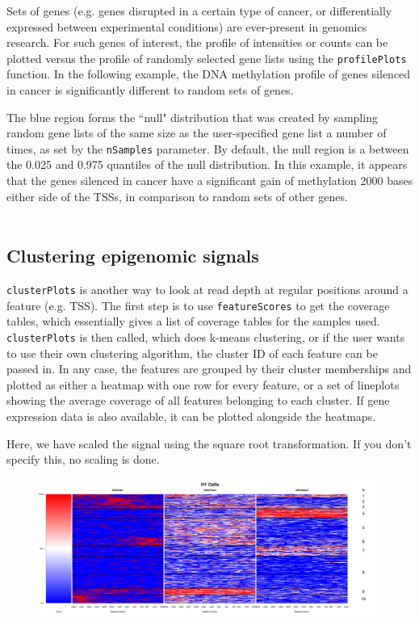 \documentclass[a4paper, 12pt]{article}
\begin{document}
Sets of genes (e.g. genes disrupted in a certain type of cancer, or differentially expressed between experimental conditions) are ever-present in genomics research.  For such genes of interest, the profile of intensities or counts can be plotted versus the profile of randomly selected gene lists using the \texttt{profilePlots} function. In the following example, the DNA methylation profile of genes silenced in cancer is significantly different to random sets of genes.



\noindent The blue region forms the ``null" distribution that was created by sampling random gene lists of the same size as the user-specified gene list a number of times, as set by the \texttt{nSamples} parameter. By default, the null region is a between the 0.025 and 0.975 quantiles of the null distribution. In this example, it appears that the genes silenced in cancer have a significant gain of methylation 2000 bases either side of the TSSs, in comparison to random sets of other genes.
\ \\ \ \\

\subsection{Clustering epigenomic signals}

\texttt{clusterPlots} is another way to look at read depth at regular positions around a feature (e.g. TSS). The first step is to use \texttt{featureScores} to get the coverage tables, which essentially gives a list of coverage tables for the samples used. \texttt{clusterPlots} is then called, which does k-means clustering, or if the user wants to use their own clustering algorithm, the cluster ID of each feature can be passed in. In any case, the features are grouped by their cluster memberships and plotted as either a heatmap with one row for every feature, or a set of lineplots showing the average coverage of all features belonging to each cluster. If gene expression data is also available, it can be plotted alongside the heatmaps.



Here, we have scaled the signal using the square root transformation.  If you don't specify this, no scaling is done.

\begin{figure}[!h]
    \begin{center}
        \includegraphics[height=0.48\textheight, width = 1.1\textwidth]{clusterPlot.png}
    \end{center}
\end{figure}
\end{document}
